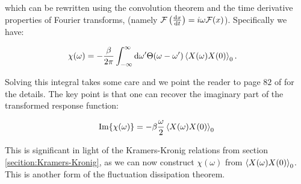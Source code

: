 \noindent which can be rewritten using the convolution theorem and the time derivative properties of Fourier transforms, (namely $\mathcal{F} \left( \dv{x}{t} \right) = i \omega \mathcal{F} (x)$). Specifically we have:

\begin{align}
\chi(\omega) &= - \frac{\beta}{2 \pi} \int_{-\infty}^{\infty} \dd \omega ' \Theta(\omega - \omega ') \expval{X(\omega)X(0)}_0.
\end{align}

\noindent Solving this integral takes some care and we point the reader to page $82$ of \cite{LiviPoliti2017} for the details. The key point is that one can recover the imaginary part of the transformed response function:

\begin{align}
\Im{ \chi(\omega)} = - \beta \frac{\omega}{2} \expval{X(\omega)X(0)}_0
\end{align}

\noindent This is significant in light of the Kramers-Kronig relations from section \ref{secition:Kramers-Kronig}, as we can now construct $\chi(\omega)$ from $\expval{X(\omega)X(0)}_0$. This is another form of the fluctuation dissipation theorem.